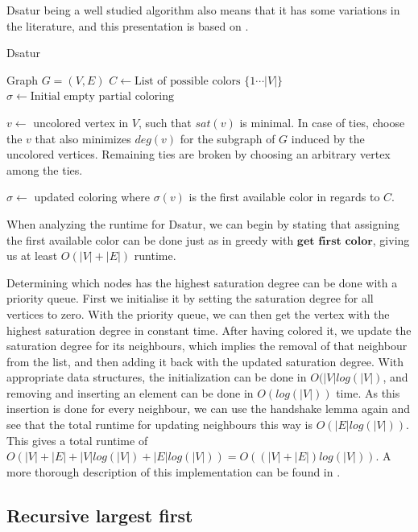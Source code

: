 \documentclass[a4paper]{article}
\begin{document}
Dsatur being a well studied
algorithm also means that it has some variations in the literature, and this
presentation is based on \cite{Constructive}.
\begin{algorithm}[H]
  \caption{Dsatur}
    \label{alg:dsatur}
  \begin{algorithmic}[1]
      \REQUIRE Graph $G = (V,E)$
      \STATE $C \leftarrow \text{List of possible colors $\{1 \cdots |V| \}$ }$
      \STATE $\sigma \leftarrow \text{Initial empty partial coloring}$
      

        \STATE $v \leftarrow$ uncolored vertex in $V$, such that $sat(v)$ is
        minimal. In case of ties, choose the $v$ that also minimizes $deg(v)$
        for the subgraph of $G$ induced by the uncolored vertices. Remaining
        ties are broken by choosing an arbitrary vertex among the ties.

        \STATE $\sigma \leftarrow$ updated coloring where $\sigma(v)$ is the first
        available color in regards to $C$.
      \ENDWHILE
  \end{algorithmic}
\end{algorithm}
When analyzing the runtime for Dsatur, we can begin by stating that
assigning the first available color can be done just as in greedy with
$\textbf{get first color}$, giving us at least $O(|V|+|E|)$ runtime. 

Determining which nodes has the highest saturation degree can be done with a
priority queue.  First we initialise it by setting the saturation degree for all
vertices to zero. With the priority queue, we can then get the vertex with the
highest saturation degree in constant time. After having colored it, we update
the saturation degree for its neighbours, which implies the removal of that
neighbour from the list, and then adding it back with the updated saturation
degree. With appropriate data structures, the initialization can be done in
$O(|V|log(|V|)$, and removing and inserting an element can be done in $O(log(|V|))$
time. As this insertion is done for every neighbour, we can use the handshake
lemma again and see that the total runtime for updating neighbours this way is
$O(|E|log(|V|))$. This gives a total runtime of $O(|V|+|E|+|V|log(|V|)+|E|log(|V|))
= O( (|V|+|E|)log(|V|))$. A more thorough description of this implementation can
be found in \cite{Constructive}.

\subsection{Recursive largest first}
\end{document}

